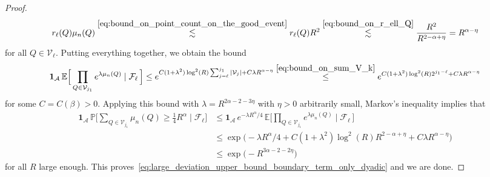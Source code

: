 \documentclass[11pt]{amsart}
\theoremstyle{definition}
\theoremstyle{remark}
\numberwithin{equation}{section}
\def\la{{\lambda}}
\newcommand{\bP}{\mathbb P}
\newcommand{\bE}{\mathbb E}
\begin{document}
\begin{proof}
		\[
		r_\ell(Q) \mu_n(Q) \stackrel{\eqref{eq:bound_on_point_count_on_the_good_event}}{\lesssim}  r_\ell(Q) R^2  \stackrel{\eqref{eq:bound_on_r_ell_Q}}{\lesssim} \frac{R^2}{R^{2-\alpha+\eta}} = R^{\alpha -\eta}
		\] 
		for all $Q\in \mathcal{V}_\ell$. Putting everything together, we obtain the bound
		\begin{equation*}
			\mathbf{1}_{\mathcal{A}} \, \bE\Big[\prod_{Q\in \mathcal{V}_{j_1}} e^{\la \mu_n(Q)} \mid \mathcal{F}_{\ell} \, \Big] \le e^{C (1+ \la^2) \log^2(R) \sum_{j=\ell}^{j_1} |\mathcal{V}_j| + C\la R^{\alpha -\eta}}  \stackrel{\eqref{eq:bound_on_sum_V_k}}{\le}  e^{C(1+\la^2) \log^2(R) 2^{j_1-\ell} + C\la R^{\alpha -\eta}} 
		\end{equation*}
		for some $C=C(\beta)>0$. Applying this bound with $\la = R^{2\alpha -2 -3\eta}$ with $\eta>0$ arbitrarily small, Markov's inequality implies that
		\begin{align*}
			\mathbf{1}_{\mathcal{A}} \, \bP\Big[\sum_{Q\in \mathcal{V}_{j_1}} \mu_n(Q) \ge \tfrac{1}{4} R^\alpha \mid \mathcal{F}_\ell\Big] &\le \mathbf{1}_{\mathcal{A}} \, e^{-\la R^\alpha/4} \, \bE\Big[\prod_{Q\in \mathcal{V}_{j_1}} e^{\la \mu_n(Q)} \mid \mathcal{F}_{\ell} \, \Big] \\ & \le \exp\Big(-\la R^{\alpha}/4 +C(1+\la^2) \log^2(R) R^{2-\alpha +\eta} + C\la R^{\alpha -\eta}\Big) \\ & \le \exp\Big(-R^{3\alpha-2-2\eta}\Big)
		\end{align*}
		for all $R$ large enough. This proves~\eqref{eq:large_deviation_upper_bound_boundary_term_only_dyadic} and we are done.
	\end{proof}
\end{document}

